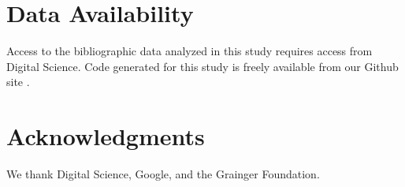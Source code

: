 \documentclass[12pt, oneside]{article}   	%
\begin{document}
\section*{Data Availability} Access to the bibliographic data analyzed in this study requires access from Digital Science. Code generated for this study is freely available from our Github site \citep{Park2021}.

\section*{Acknowledgments} We thank Digital Science, Google, and the Grainger Foundation.



\end{document}
